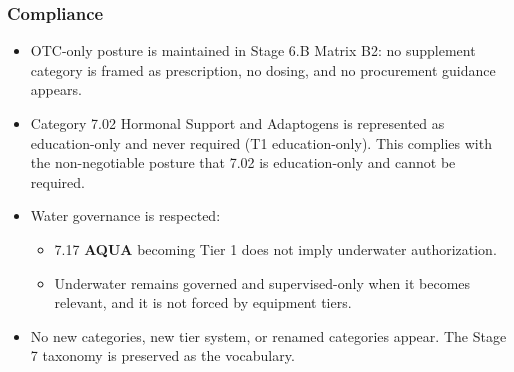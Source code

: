 \documentclass[10pt]{article}
\begin{document}
\subsubsection*{Compliance}

\begin{itemize}
\item OTC-only posture is maintained in Stage 6.B Matrix B2: no supplement category is framed as prescription, no dosing, and no procurement guidance appears.
\item Category 7.02 Hormonal Support and Adaptogens is represented as education-only and never required (T1 education-only). This complies with the non-negotiable posture that 7.02 is education-only and cannot be required.
\item Water governance is respected:
  \begin{itemize}
  \item 7.17 \textbf{AQUA} becoming Tier 1 does not imply underwater authorization.
  \item Underwater remains governed and supervised-only when it becomes relevant, and it is not forced by equipment tiers.
  \end{itemize}
\item No new categories, new tier system, or renamed categories appear. The Stage 7 taxonomy is preserved as the vocabulary.
\end{itemize}
\end{document}
